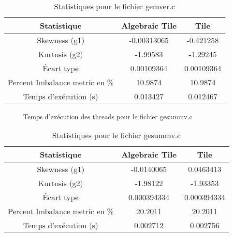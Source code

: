 \documentclass{article}
\begin{document}
\begin{table}[htbp]
  \centering
  \caption{Statistiques pour le fichier gemver.c}
  \begin{tabular}{|c|c|c|}
    \hline
    Statistique & Algebraic Tile & Tile \\ 
    \hline
    Skewness (g1) & -0.00313065 & -0.421258 \\ 
    Kurtosis (g2) & -1.99583 & -1.29245 \\ 
    Écart type & 0.00109364 & 0.00109364 \\ 
    Percent Imbalance metric en \% & 10.9874 & 10.9874 \\ 
    Temps d'exécution (s) &  0.013427      &  0.012467    \\ 
    \hline
  \end{tabular}
\end{table}
\newpage

\begin{figure}
  \centering
  \caption{Temps d'exécution des threads pour le fichier gesummv.c}
  \label{fig:gesummv.c}
\end{figure}

\begin{table}[htbp]
  \centering
  \caption{Statistiques pour le fichier gesummv.c}
  \begin{tabular}{|c|c|c|}
    \hline
    Statistique & Algebraic Tile & Tile \\ 
    \hline
    Skewness (g1) & -0.0140065 & 0.0463413 \\ 
    Kurtosis (g2) & -1.98122 & -1.93353 \\ 
    Écart type & 0.000394334 & 0.000394334 \\ 
    Percent Imbalance metric en \% & 20.2011 & 20.2011 \\ 
    Temps d'exécution (s) &  0.002712      &  0.002756    \\ 
    \hline
  \end{tabular}
\end{table}
\newpage
\end{document}
